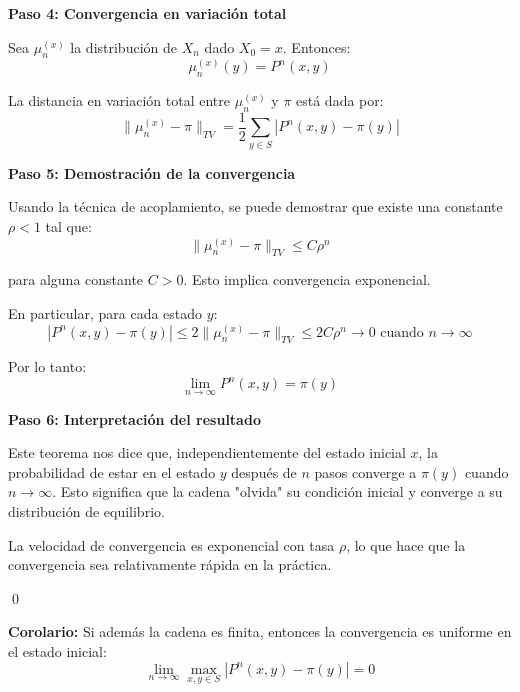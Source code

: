 \documentclass[12pt,a4paper]{article}
\begin{document}
\textbf{Paso 4: Convergencia en variación total}

Sea $\mu_n^{(x)}$ la distribución de $X_n$ dado $X_0 = x$. Entonces:
\begin{equation*}
\mu_n^{(x)}(y) = P^n(x,y)
\end{equation*}

La distancia en variación total entre $\mu_n^{(x)}$ y $\pi$ está dada por:
\begin{equation*}
\|\mu_n^{(x)} - \pi\|_{TV} = \frac{1}{2}\sum_{y \in S} |P^n(x,y) - \pi(y)|
\end{equation*}

\textbf{Paso 5: Demostración de la convergencia}

Usando la técnica de acoplamiento, se puede demostrar que existe una constante $\rho < 1$ tal que:
\begin{equation*}
\|\mu_n^{(x)} - \pi\|_{TV} \leq C \rho^n
\end{equation*}

para alguna constante $C > 0$. Esto implica convergencia exponencial.

En particular, para cada estado $y$:
\begin{equation*}
|P^n(x,y) - \pi(y)| \leq 2\|\mu_n^{(x)} - \pi\|_{TV} \leq 2C \rho^n \to 0 \text{ cuando } n \to \infty
\end{equation*}

Por lo tanto:
\begin{equation*}
\lim_{n \to \infty} P^n(x,y) = \pi(y)
\end{equation*}

\textbf{Paso 6: Interpretación del resultado}

Este teorema nos dice que, independientemente del estado inicial $x$, la probabilidad de estar en el estado $y$ después de $n$ pasos converge a $\pi(y)$ cuando $n \to \infty$. Esto significa que la cadena "olvida" su condición inicial y converge a su distribución de equilibrio.

La velocidad de convergencia es exponencial con tasa $\rho$, lo que hace que la convergencia sea relativamente rápida en la práctica.

\qed

\textbf{Corolario:} Si además la cadena es finita, entonces la convergencia es uniforme en el estado inicial:
\begin{equation*}
\lim_{n \to \infty} \max_{x,y \in S} |P^n(x,y) - \pi(y)| = 0
\end{equation*}
\end{document}
